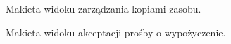 \begin{figure}[H]
    \centering
    \caption{Makieta widoku zarządzania kopiami zasobu.}
\end{figure}

\begin{figure}[H]
    \centering
    \caption{Makieta widoku akceptacji prośby o wypożyczenie.}
\end{figure}


